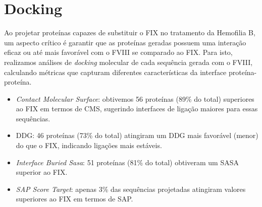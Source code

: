 \section{Docking}       

Ao projetar proteínas capazes de substituir o FIX no tratamento da Hemofilia B, um aspecto crítico é garantir que as 
proteínas geradas possuem uma interação eficaz ou até mais favorável com o FVIII se comparado ao FIX.
Para isto, realizamos análises de \textit{docking} molecular de cada sequência gerada com o FVIII,
calculando métricas que capturam diferentes características da interface proteína-proteína. 

\begin{itemize}
    \item \textit{Contact Molecular Surface}: obtivemos 56 proteínas (89\% do total) superiores ao FIX em termos de CMS, 
    sugerindo interfaces de ligação maiores para essas sequências.
    \item DDG: 46 proteínas (73\% do total) atingiram um DDG mais favorável (menor) do que o FIX, indicando ligações mais estáveis.   
    \item \textit{Interface Buried Sasa}: 51 proteínas (81\% do total) obtiveram um SASA superior ao FIX.
    \item \textit{SAP Score Target}: apenas 3\% das sequências projetadas atingiram valores superiores ao FIX em termos de SAP.
  \end{itemize}


